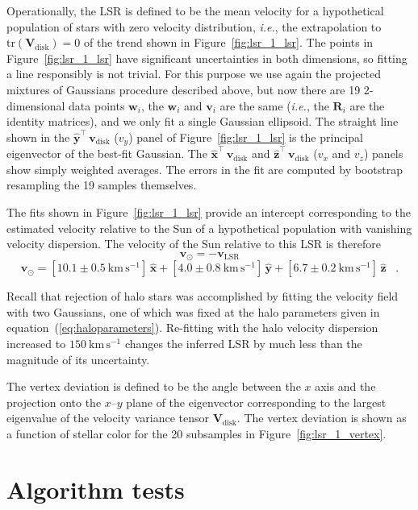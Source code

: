 \documentclass[12pt,preprint]{aastex}
\newcommand{\latin}[1]{\textit{#1}}
\newcommand{\ie}{\latin{i.e.}}
\renewcommand{\vec}[1]{\mathbf{#1}} %
\newcommand{\vv}{\vec{v}}
\newcommand{\ww}{\vec{w}}
\newcommand{\eex}{\vec{\hat{x}}}
\newcommand{\eey}{\vec{\hat{y}}}
\newcommand{\eez}{\vec{\hat{z}}}
\newcommand{\vvi}{\vv_i}
\newcommand{\vvdisk}{\vv_\mathrm{disk}}
\newcommand{\vvlsr}{\vv_\mathrm{LSR}}
\newcommand{\vvsun}{\vv_\odot}
\newcommand{\wwi}{\ww_i}
\newcommand{\ten}[1]{\mathbf{#1}} %
\newcommand{\RR}{\ten{R}}
\newcommand{\VV}{\ten{V}}
\newcommand{\RRi}{\RR_i}
\newcommand{\VVdisk}{\VV_\mathrm{\!disk}}
\newcommand{\T}{^{\scriptscriptstyle \top}}   %
\newcommand{\tr}{\mathrm{tr}}                 %
\begin{document}
Operationally, the LSR is defined to be the mean velocity for a
hypothetical population of stars with zero velocity distribution, \ie,
the extrapolation to $\tr(\VVdisk) = 0$ of the trend shown in
Figure~\ref{fig:lsr_1_lsr}.  The points in Figure~\ref{fig:lsr_1_lsr}
have significant uncertainties in both dimensions, so fitting a line
responsibly is not trivial.  For this purpose we use again the
projected mixtures of Gaussians procedure described above, but now
there are 19 2-dimensional data points $\wwi$, the $\wwi$ and $\vvi$
are the same (\ie, the $\RRi$ are the identity matrices), and we only
fit a single Gaussian ellipsoid.  The straight line shown in the
$\eey\T\,\vvdisk$ ($v_y$) panel of Figure~\ref{fig:lsr_1_lsr} is the
principal eigenvector of the best-fit Gaussian.  The $\eex\T\,\vvdisk$
and $\eez\T\,\vvdisk$ ($v_x$ and $v_z$) panels show simply weighted
averages.  The errors in the fit are computed by bootstrap resampling
the 19 samples themselves.

The fits shown in Figure~\ref{fig:lsr_1_lsr} provide an intercept
corresponding to the estimated velocity relative to the Sun of a
hypothetical population with vanishing velocity dispersion.  The
velocity of the Sun relative to this LSR is therefore
\begin{equation}
\vvsun = -\vvlsr
\end{equation}
\begin{equation}
\vvsun = [10.1\pm0.5~\mathrm{km\,s^{-1}}]\,\eex
       + [ 4.0\pm0.8~\mathrm{km\,s^{-1}}]\,\eey
       + [ 6.7\pm0.2~\mathrm{km\,s^{-1}}]\,\eez \;\;\;.
\end{equation}

Recall that rejection of halo stars was accomplished by fitting the
velocity field with two Gaussians, one of which was fixed at the halo
parameters given in equation~(\ref{eq:haloparameters}).  Re-fitting
with the halo velocity dispersion increased to
$150~\mathrm{km\,s^{-1}}$ changes the inferred LSR by much less
than the magnitude of its uncertainty.

The vertex deviation is defined to be the angle between the $x$ axis
and the projection onto the $x$--$y$ plane of the eigenvector
corresponding to the largest eigenvalue of the velocity variance
tensor $\VVdisk$.  The vertex deviation is shown as a function of
stellar color for the 20 subsamples in Figure~\ref{fig:lsr_1_vertex}.

\section{Algorithm tests}
\end{document}
